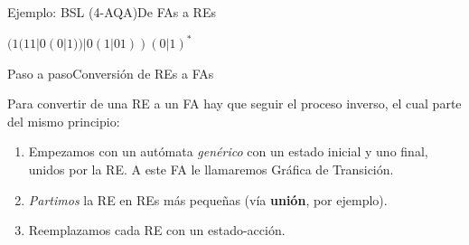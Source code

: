 \documentclass[spanish]{beamer}
\begin{document}
\begin{frame}{Ejemplo: BSL (4-AQA)}{De FAs a REs}
    \begin{center}
        {\huge $(1(11 | 0(0|1)) | 0(1 | 01))(0|1)^*$}
    \end{center}
\end{frame}

\begin{frame}{Paso a paso}{Conversión de REs a FAs}
    
    Para convertir de una RE a un FA hay que seguir el proceso inverso, el cual parte del mismo principio:

    \bigskip

    \begin{enumerate}
        \itemsep1.5em
        \item Empezamos con un autómata \textit{genérico} con un estado inicial y uno final, unidos por la RE. A este FA le llamaremos \alert{Gráfica de Transición}. \pause
        \item \textit{Partimos} la RE en REs más pequeñas (vía \textbf{unión}, por ejemplo).
        \item Reemplazamos cada RE con un estado-acción.
    \end{enumerate}
\end{frame}
\end{document}
